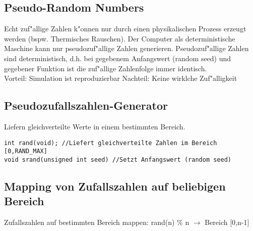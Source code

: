 \subsection{Pseudo-Random Numbers}
Echt zuf"allige Zahlen k"onnen nur durch einen physikalischen Prozess erzeugt werden (bspw. Thermisches Rauschen). Der Computer als deterministische Maschine kann nur pseudozuf"allige Zahlen generieren. 
Pseudozuf"allige Zahlen sind deterministisch, d.h. bei gegebenem Anfangswert (random seed) und gegebener Funktion ist die zuf"allige Zahlenfolge immer identisch.\\
Vorteil: Simulation ist reproduzierbar
Nachteil: Keine wirklche Zuf"alligkeit

\subsection{Pseudozufallszahlen-Generator}
Liefern gleichverteilte Werte in einem bestimmten Bereich. 
\begin{lstlisting}[style=C]
int rand(void); //Liefert gleichverteilte Zahlen im Bereich [0,RAND_MAX]
void srand(unsigned int seed) //Setzt Anfangswert (random seed)
\end{lstlisting}
\subsection{Mapping von Zufallszahlen auf beliebigen Bereich}
Zufallszahlen auf bestimmten Bereich mappen: 
rand(n) \% n $\rightarrow$ Bereich [0,n-1]

